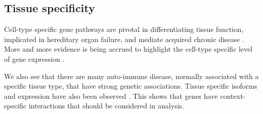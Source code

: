 \documentclass[12pt]{article} %
\begin{document}
%	
%	
	
	\subsection{Tissue specificity} \label{sec:tissue_specificity}
	Cell-type specific gene pathways are pivotal in differentiating tissue function, implicated in hereditary organ failure, and mediate acquired chronic disease \cite{ju_defining_2013}. More and more evidence is being accrued to highlight the cell-type specific level of gene expression \cite{grundberg_mapping_2012}\cite{ong_enhancer_2011}\cite{maniatis_regulation_1987}. 
	
	
	We also see that there are many auto-immune disease, normally associated with a specific tissue type, that have strong genetic associations. Tissue specific isoforms and expression have also been observed \cite{wang_alternative_2008}. This shows that genes have context-specific interactions that should be considered in analysis.
	
\end{document}
